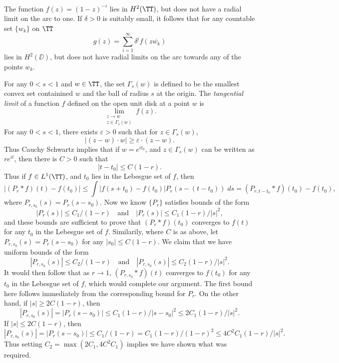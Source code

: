 \begin{example}
    The function $f(z) = (1 - z)^{-i}$ lies in $H^2(\TT)$, but does not have a radial limit on the arc to one. If $\delta > 0$ is suitably small, it follows that for any countable set $\{ w_k \}$ on $\TT$
    \[ g(z) = \sum_{i = 1}^\infty \delta^i f( z \overline{w_k} ) \]
    lies in $H^2(\DD)$, but does not have radial limits on the arc towards any of the points $w_k$.

    For any $0 < s < 1$ and $w \in \TT$, the set $\Gamma_s(w)$ is defined to be the smallest convex set containined $w$ and the ball of radius $s$ at the origin. The \emph{tangential limit} of a function $f$ defined on the open unit disk at a point $w$ is
    \[ \lim_{\substack{z \to w\\z \in \Gamma_s(w)}} f(z). \]
    For any $0 < s < 1$, there exists $\varepsilon > 0$ such that for $z \in \Gamma_s(w)$,
    \[ |(z - w) \cdot w| \geq \varepsilon \cdot (z - w). \]
    Thus Cauchy Schwartz implies that if $w = e^{it_0}$, and $z \in \Gamma_s(w)$ can be written as $r e^{it}$, then there is $C > 0$ such that
    \[ |t - t_0| \leq C (1 - r). \]
    Thus if $f \in L^1(\TT)$, and $t_0$ lies in the Lebesgue set of $f$, then
    \[ |(P_r * f)(t) - f(t_0)| \leq \int |f(s + t_0) - f(t_0)| P_r(s - (t - t_0))\; ds = (P_{r,t-t_0} * f)(t_0) - f(t_0), \]
    where $P_{r,s_0}(s) = P_r(s - s_0)$. Now we know $\{ P_r \}$ satisfies bounds of the form
    \[ |P_r(s)| \leq C_1 / (1 - r) \quad\text{and}\quad |P_r(s)| \leq C_1 (1 - r) / |s|^2, \]
    and these bounds are sufficient to prove that $(P_r * f)(t_0)$ converges to $f(t)$ for any $t_0$ in the Lebesgue set of $f$. Similarily, where $C$ is as above, let $P_{r,s_0}(s) = P_r(s - s_0)$ for any $|s_0| \leq C (1 - r)$. We claim that we have uniform bounds of the form
    \[ |P_{r,s_0}(s)| \leq C_2 / (1 - r) \quad\text{and}\quad |P_{r,s_0}(s)| \leq C_2 (1 - r) / |s|^2. \]
    It would then follow that as $r \to 1$, $(P_{r,s_0} * f)(t)$ converges to $f(t_0)$ for any $t_0$ in the Lebesgue set of $f$, which would complete our argument. The first bound here follows immediately from the corresponding bound for $P_r$. On the other hand, if $|s| \geq 2C (1 - r)$, then
    \[ |P_{r,s_0}(s)| = |P_r(s - s_0)| \leq C_1 (1 - r) / |s - s_0|^2 \leq 2 C_1 (1 - r) / |s|^2. \]
    If $|s| \leq 2C (1 - r)$, then
    \[ |P_{r,s_0}(s)| = |P_r(s - s_0)| \leq C_1 / (1 - r) = C_1 (1 - r) / (1 - r)^2 \leq 4C^2 C_1 (1 - r) / |s|^2. \]
    Thus setting $C_2 = \max(2C_1,4C^2 C_1)$ implies we have shown what was required.
\end{example}

